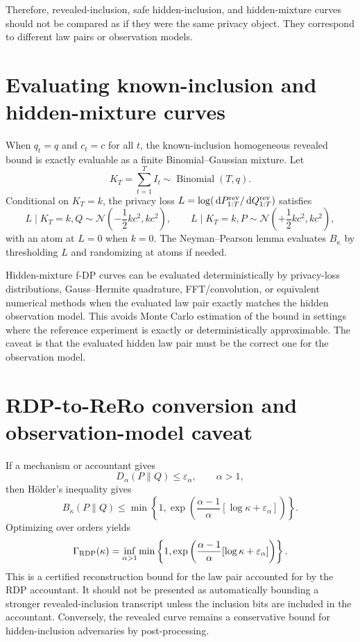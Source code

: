 \documentclass[11pt,a4paper]{report}
\theoremstyle{plain}
\theoremstyle{definition}
\theoremstyle{remark}
\DeclareMathOperator{\Bin}{Binomial}
\newcommand{\N}{\mathcal{N}}
\newcommand{\dd}{\,\mathrm d}
\begin{document}
Therefore, revealed-inclusion, safe hidden-inclusion, and hidden-mixture curves should not be compared as if they were the same privacy object.  They correspond to different law pairs or observation models.

\section{Evaluating known-inclusion and hidden-mixture curves}
\label{sec:evaluation-curves}

When $q_t=q$ and $c_t=c$ for all $t$, the known-inclusion homogeneous revealed bound is exactly evaluable as a finite Binomial--Gaussian mixture.  Let
\[
K_T=\sum_{t=1}^T I_t\sim\Bin(T,q).
\]
Conditional on $K_T=k$, the privacy loss $L=\log(\dd P_{1:T}^{\rm rev}/\dd Q_{1:T}^{\rm rev})$ satisfies
\[
L\mid K_T=k,Q
\sim
\N\left(-\frac12kc^2,kc^2\right),
\qquad
L\mid K_T=k,P
\sim
\N\left(+\frac12kc^2,kc^2\right),
\]
with an atom at $L=0$ when $k=0$.  The Neyman--Pearson lemma evaluates $B_\kappa$ by thresholding $L$ and randomizing at atoms if needed.

Hidden-mixture f-DP curves can be evaluated deterministically by privacy-loss distributions, Gauss--Hermite quadrature, FFT/convolution, or equivalent numerical methods when the evaluated law pair exactly matches the hidden observation model.  This avoids Monte Carlo estimation of the bound in settings where the reference experiment is exactly or deterministically approximable.  The caveat is that the evaluated hidden law pair must be the correct one for the observation model.

\section{RDP-to-ReRo conversion and observation-model caveat}
\label{sec:transcript-rdp-conversion}

If a mechanism or accountant gives
\[
D_\alpha(P\|Q)\le\varepsilon_\alpha,
\qquad \alpha>1,
\]
then H\"older's inequality gives
\[
B_\kappa(P\|Q)
\le
\min\left\{1,
\exp\left(
\frac{\alpha-1}{\alpha}[\log\kappa+\varepsilon_\alpha]
\right)
\right\}.
\]
Optimizing over orders yields
\[
\Gamma_{\rm RDP}(\kappa)
=
\inf_{\alpha>1}
\min\left\{1,
\exp\left(
\frac{\alpha-1}{\alpha}[\log\kappa+\varepsilon_\alpha]
\right)
\right\}.
\]
This is a certified reconstruction bound for the law pair accounted for by the RDP accountant.  It should not be presented as automatically bounding a stronger revealed-inclusion transcript unless the inclusion bits are included in the accountant.  Conversely, the revealed curve remains a conservative bound for hidden-inclusion adversaries by post-processing.
\end{document}
